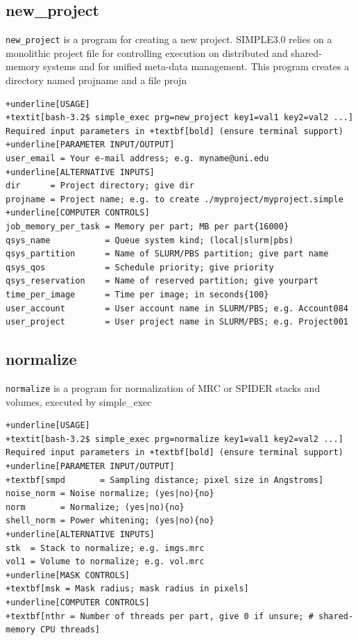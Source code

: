 \documentclass[a4paper,11pt]{article}
\newcommand{\prgname}[1]{\textcolor{NavyBlue}{\texttt{#1}}}
\begin{document}
\subsection{new\_project}
\label{new_project}
\prgname{new\_project} is a program for creating a new project. SIMPLE3.0 relies on a monolithic project file for controlling execution on distributed and shared-memory systems and for unified meta-data management. This program creates a directory named projname and a file projn
\begin{Verbatim}[commandchars=+\[\],fontsize=\small,breaklines=true]
+underline[USAGE]
+textit[bash-3.2$ simple_exec prg=new_project key1=val1 key2=val2 ...]
Required input parameters in +textbf[bold] (ensure terminal support)
+underline[PARAMETER INPUT/OUTPUT]
user_email = Your e-mail address; e.g. myname@uni.edu
+underline[ALTERNATIVE INPUTS]
dir      = Project directory; give dir
projname = Project name; e.g. to create ./myproject/myproject.simple
+underline[COMPUTER CONTROLS]
job_memory_per_task = Memory per part; MB per part{16000}
qsys_name           = Queue system kind; (local|slurm|pbs)
qsys_partition      = Name of SLURM/PBS partition; give part name
qsys_qos            = Schedule priority; give priority
qsys_reservation    = Name of reserved partition; give yourpart
time_per_image      = Time per image; in seconds{100}
user_account        = User account name in SLURM/PBS; e.g. Account084
user_project        = User project name in SLURM/PBS; e.g. Project001
\end{Verbatim}

\subsection{normalize}
\label{normalize}
\prgname{normalize} is a program for normalization of MRC or SPIDER stacks and volumes, executed by simple\_exec
\begin{Verbatim}[commandchars=+\[\],fontsize=\small,breaklines=true]
+underline[USAGE]
+textit[bash-3.2$ simple_exec prg=normalize key1=val1 key2=val2 ...]
Required input parameters in +textbf[bold] (ensure terminal support)
+underline[PARAMETER INPUT/OUTPUT]
+textbf[smpd       = Sampling distance; pixel size in Angstroms]
noise_norm = Noise normalize; (yes|no){no}
norm       = Normalize; (yes|no){no}
shell_norm = Power whitening; (yes|no){no}
+underline[ALTERNATIVE INPUTS]
stk  = Stack to normalize; e.g. imgs.mrc
vol1 = Volume to normalize; e.g. vol.mrc
+underline[MASK CONTROLS]
+textbf[msk = Mask radius; mask radius in pixels]
+underline[COMPUTER CONTROLS]
+textbf[nthr = Number of threads per part, give 0 if unsure; # shared-memory CPU threads]
\end{Verbatim}
\end{document}
